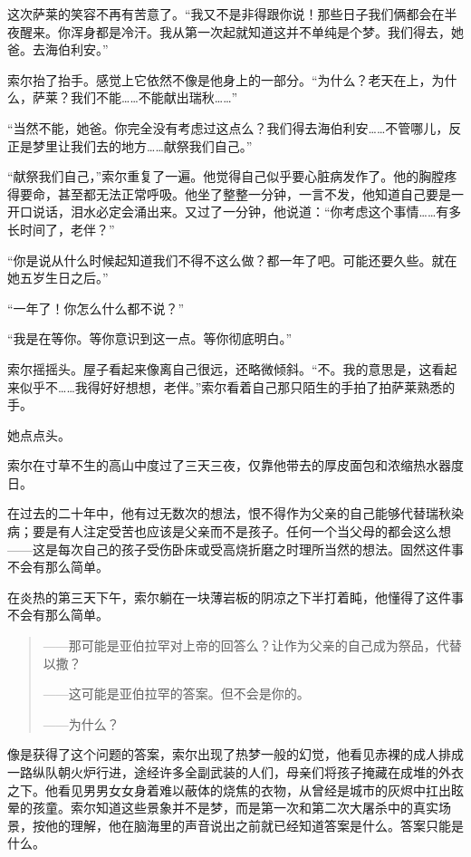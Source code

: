 \documentclass[AutoFakeBold=true]{book}
\begin{document}
这次萨莱的笑容不再有苦意了。``我又不是非得跟你说！那些日子我们俩都会在半夜醒来。你浑身都是冷汗。我从第一次起就知道这并不单纯是个梦。我们得去，她爸。去海伯利安。''

索尔抬了抬手。感觉上它依然不像是他身上的一部分。``为什么？老天在上，为什么，萨莱？我们不能……不能献出瑞秋……''

``当然不能，她爸。你完全没有考虑过这点么？我们得去海伯利安……不管哪儿，反正是梦里让我们去的地方……献祭我们自己。''

``献祭我们自己，''索尔重复了一遍。他觉得自己似乎要心脏病发作了。他的胸膛疼得要命，甚至都无法正常呼吸。他坐了整整一分钟，一言不发，他知道自己要是一开口说话，泪水必定会涌出来。又过了一分钟，他说道：``你考虑这个事情……有多长时间了，老伴？''

``你是说从什么时候起知道我们不得不这么做？都一年了吧。可能还要久些。就在她五岁生日之后。''

``一年了！你怎么什么都不说？''

``我是在等你。等你意识到这一点。等你彻底明白。''

索尔摇摇头。屋子看起来像离自己很远，还略微倾斜。``不。我的意思是，这看起来似乎不……我得好好想想，老伴。''索尔看着自己那只陌生的手拍了拍萨莱熟悉的手。

她点点头。

\vspace*{1em}

索尔在寸草不生的高山中度过了三天三夜，仅靠他带去的厚皮面包和浓缩热水器度日。

在过去的二十年中，他有过无数次的想法，恨不得作为父亲的自己能够代替瑞秋染病；要是有人注定受苦也应该是父亲而不是孩子。任何一个当父母的都会这么想——这是每次自己的孩子受伤卧床或受高烧折磨之时理所当然的想法。固然这件事不会有那么简单。

在炎热的第三天下午，索尔躺在一块薄岩板的阴凉之下半打着盹，他懂得了这件事不会有那么简单。

\begin{quotation}
	——那可能是亚伯拉罕对上帝的回答么？让作为父亲的自己成为祭品，代替以撒？

	{\kaishu ——这可能是亚伯拉罕的答案。但不会是你的。}

	——为什么？
\end{quotation}

像是获得了这个问题的答案，索尔出现了热梦一般的幻觉，他看见赤裸的成人排成一路纵队朝火炉行进，途经许多全副武装的人们，母亲们将孩子掩藏在成堆的外衣之下。他看见男男女女身着难以蔽体的烧焦的衣物，从曾经是城市的灰烬中扛出眩晕的孩童。索尔知道这些景象并不是梦，而是第一次和第二次大屠杀中的真实场景，按他的理解，他在脑海里的声音说出之前就已经知道答案是什么。答案只能是什么。
\end{document}
